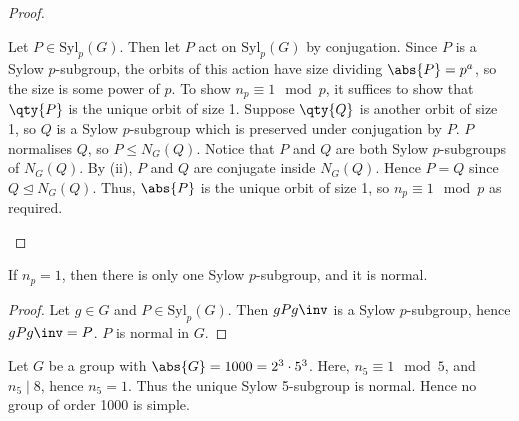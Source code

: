 \begin{proof}
\begin{enumerate}
		      Let $P \in \mathrm{Syl}_p(G)$.
		      Then let $P$ act on $\mathrm{Syl}_p(G)$ by conjugation.
		      Since $P$ is a Sylow $p$-subgroup, the orbits of this action have size dividing $\abs{P} = p^a$, so the size is some power of $p$.
		      To show $n_p \equiv 1 \mod p$, it suffices to show that $\qty{P}$ is the unique orbit of size 1.
		      Suppose $\qty{Q}$ is another orbit of size 1, so $Q$ is a Sylow $p$-subgroup which is preserved under conjugation by $P$.
		      $P$ normalises $Q$, so $P \leq N_G(Q)$.
		      Notice that $P$ and $Q$ are both Sylow $p$-subgroups of $N_G(Q)$.
		      By (ii), $P$ and $Q$ are conjugate inside $N_G(Q)$.
		      Hence $P = Q$ since $Q \trianglelefteq N_G(Q)$.
		      Thus, $\abs{P}$ is the unique orbit of size 1, so $n_p \equiv 1 \mod p$ as required.
	\end{enumerate}
\end{proof}

\begin{corollary}
	If $n_p = 1$, then there is only one Sylow $p$-subgroup, and it is normal.
\end{corollary}

\begin{proof}
	Let $g \in G$ and $P \in \mathrm{Syl}_p(G)$.
	Then $g P g\inv$ is a Sylow $p$-subgroup, hence $g P g\inv = P$.
	$P$ is normal in $G$.
\end{proof}

\begin{example}
	Let $G$ be a group with $\abs{G} = 1000 = 2^3 \cdot 5^3$.
	Here, $n_5 \equiv 1 \mod 5$, and $n_5 \mid 8$, hence $n_5 = 1$.
	Thus the unique Sylow 5-subgroup is normal.
	Hence no group of order 1000 is simple.
\end{example}

